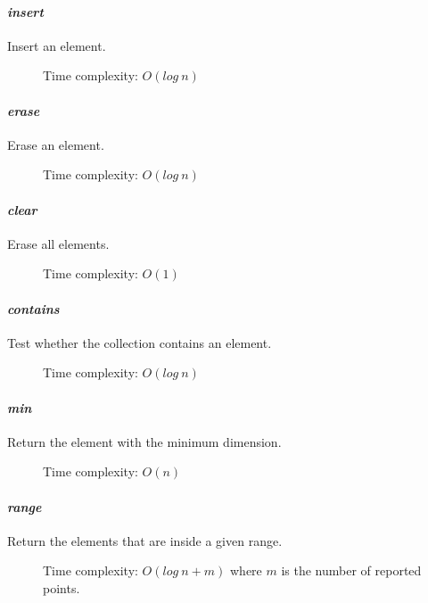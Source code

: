 \documentclass{article}
\begin{document}
\paragraph*{\textit{insert}} Insert an element.
\begin{description}
\item[] Time complexity: $O(log~n)$ 
\end{description}

\paragraph*{\textit{erase}} Erase an element.
\begin{description}
\item[] Time complexity: $O(log~n)$ 
\end{description}

\paragraph*{\textit{clear}} Erase all elements.
\begin{description}
\item[] Time complexity: $O(1)$
\end{description}

\paragraph*{\textit{contains}} Test whether the collection contains an element.
\begin{description}
\item[] Time complexity: $O(log~n)$ 
\end{description}

\paragraph*{\textit{min}} Return the element with the minimum dimension.
\begin{description}
\item[] Time complexity: $O(n)$ 
\end{description}

\paragraph*{\textit{range}} Return the elements that are inside a given range.
\begin{description}
\item[] Time complexity: $O(log~n + m)$ where $m$ is the number of reported points.
\end{description}
\end{document}
